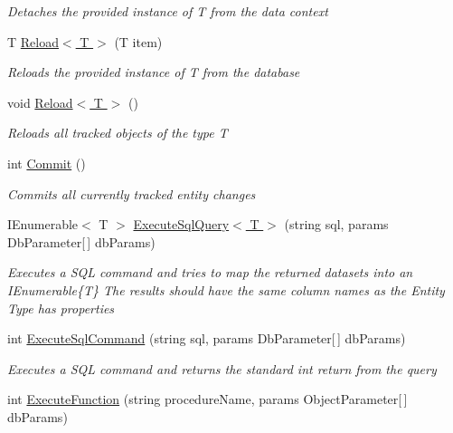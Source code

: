 \begin{DoxyCompactItemize}
\begin{DoxyCompactList}\small\item\em Detaches the provided instance of {\itshape T}  from the data context \end{DoxyCompactList}\item 
T \hyperlink{interface_highway_1_1_data_1_1_interfaces_1_1_i_data_context_ac56bd7fbcb297fd6d0deb0edafe057df}{Reload$<$ T $>$} (T item)
\begin{DoxyCompactList}\small\item\em Reloads the provided instance of {\itshape T}  from the database \end{DoxyCompactList}\item 
void \hyperlink{interface_highway_1_1_data_1_1_interfaces_1_1_i_data_context_a8b5557c0e54d1447d2f8a8e68bf4e1f0}{Reload$<$ T $>$} ()
\begin{DoxyCompactList}\small\item\em Reloads all tracked objects of the type {\itshape T}  \end{DoxyCompactList}\item 
int \hyperlink{interface_highway_1_1_data_1_1_interfaces_1_1_i_data_context_a11952cf19e2562bcd82edd9c239c1aac}{Commit} ()
\begin{DoxyCompactList}\small\item\em Commits all currently tracked entity changes \end{DoxyCompactList}\item 
I\-Enumerable$<$ T $>$ \hyperlink{interface_highway_1_1_data_1_1_interfaces_1_1_i_data_context_a975fee919078b8770313b4b8582554e5}{Execute\-Sql\-Query$<$ T $>$} (string sql, params Db\-Parameter\mbox{[}$\,$\mbox{]} db\-Params)
\begin{DoxyCompactList}\small\item\em Executes a S\-Q\-L command and tries to map the returned datasets into an I\-Enumerable\{\-T\} The results should have the same column names as the Entity Type has properties \end{DoxyCompactList}\item 
int \hyperlink{interface_highway_1_1_data_1_1_interfaces_1_1_i_data_context_ad8d3d00bdfca146ea8197e050a215be3}{Execute\-Sql\-Command} (string sql, params Db\-Parameter\mbox{[}$\,$\mbox{]} db\-Params)
\begin{DoxyCompactList}\small\item\em Executes a S\-Q\-L command and returns the standard int return from the query \end{DoxyCompactList}\item 
int \hyperlink{interface_highway_1_1_data_1_1_interfaces_1_1_i_data_context_a27f9736cd139560b0b5debe9a7bc795a}{Execute\-Function} (string procedure\-Name, params Object\-Parameter\mbox{[}$\,$\mbox{]} db\-Params)
\begin{DoxyCompactList}\small\item\em \end{DoxyCompactList}\end{DoxyCompactItemize}
